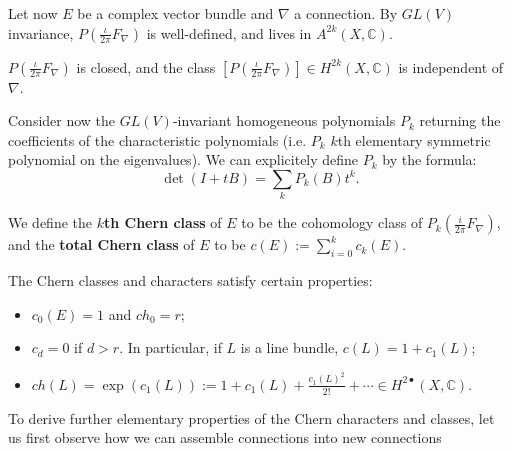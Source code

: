 \documentclass[11pt]{amsart}
\newcommand{\tbf}[1]{\textbf{#1}}
\newcommand{\C}{\mathbb C}
\theoremstyle{definition}
\numberwithin{equation}{section}
\begin{document}
Let now $E$ be a complex vector bundle and $\nabla$ a connection. By $GL(V)$ invariance, $P(\frac{\iota}{2\pi}F_\nabla)$ is well-defined, and lives in $A^{2k}(X,\C)$.
\begin{fact}
	$P(\frac{\iota}{2\pi}F_\nabla)$ is closed, and the class $[P(\frac{\iota}{2\pi}F_\nabla)]\in H^{2k}(X,\C)$ is independent of $\nabla$.
\end{fact}
Consider now the $GL(V)$-invariant homogeneous polynomials $P_k$ returning the coefficients of the characteristic polynomials (i.e. $P_k$ $k$th elementary symmetric polynomial on the eigenvalues). We can explicitely define $P_k$ by the formula:
\[
\det(I+tB)=\sum_kP_k(B)t^k.
\]

We define the \tbf{$k$th Chern class} of $E$ to be the cohomology class of $P_k(\frac{i}{2\pi}F_\nabla)$, and the \tbf{total Chern class} of $E$ to be $c(E):=\sum_{i=0}^kc_k(E)$.

The Chern classes and characters satisfy certain properties:
\begin{itemize}
	\item $c_0(E)=1$ and $ch_0=r$;
	\item $c_d=0$ if $d>r$. In particular, if $L$ is a line bundle, $c(L)=1+c_1(L)$;
	\item $ch(L)=\exp(c_1(L)):=1+c_1(L)+\frac{c_1(L)^2}{2!}+\cdots\in H^{2\bullet}(X,\C)$.
\end{itemize}

To derive further elementary properties of the Chern characters and classes, let us first observe how we can assemble connections into new connections
\end{document}
